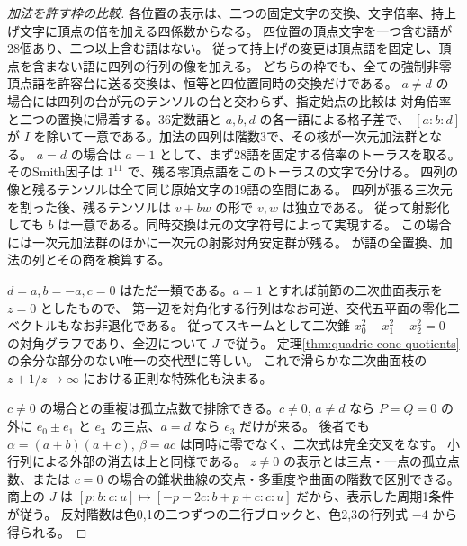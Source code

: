 \begin{proof}[加法を許す枠の比較]
各位置の表示は、二つの固定文字の交換、文字倍率、持上げ文字に頂点の倍を加える四係数からなる。
四位置の頂点文字を一つ含む語が28個あり、二つ以上含む語はない。
従って持上げの変更は頂点語を固定し、頂点を含まない語に四列の行列の像を加える。
どちらの枠でも、全ての強制非零頂点語を許容台に送る交換は、恒等と四位置同時の交換だけである。
$a\ne d$ の場合には四列の台が元のテンソルの台と交わらず、指定始点の比較は
対角倍率と二つの置換に帰着する。36定数語と $a,b,d$ の各一語による格子差で、
$[a:b:d]$ が $I$ を除いて一意である。加法の四列は階数3で、その核が一次元加法群となる。
$a=d$ の場合は $a=1$ として、まず28語を固定する倍率のトーラスを取る。
そのSmith因子は $1^{11}$ で、残る零頂点語をこのトーラスの文字で分ける。
四列の像と残るテンソルは全て同じ原始文字の19語の空間にある。
四列が張る三次元を割った後、残るテンソルは $v+bw$ の形で $v,w$ は独立である。
従って射影化しても $b$ は一意である。同時交換は元の文字符号によって実現する。
この場合には一次元加法群のほかに一次元の射影対角安定群が残る。
 が語の全置換、加法の列とその商を検算する。

$d=a,b=-a,c=0$ はただ一類である。$a=1$ とすれば前節の二次曲面表示を $z=0$ としたもので、
第一辺を対角化する行列はなお可逆、交代五平面の零化二ベクトルもなお非退化である。
従ってスキームとして二次錐 $x_0^2-x_1^2-x_2^2=0$ の対角グラフであり、全辺について $J$ で従う。
定理\ref{thm:quadric-cone-quotients}の余分な部分のない唯一の交代型に等しい。
これで滑らかな二次曲面枝の $z+1/z\to\infty$ における正則な特殊化も決まる。

$c\ne0$ の場合との重複は孤立点数で排除できる。$c\ne0$, $a\ne d$ なら
$P=Q=0$ の外に $e_0\pm e_1$ と $e_3$ の三点、$a=d$ なら $e_3$ だけが来る。
後者でも $\alpha=(a+b)(a+c),\ \beta=ac$ は同時に零でなく、二次式は完全交叉をなす。
小行列による外部の消去は上と同様である。
$z\ne0$ の表示とは三点・一点の孤立点数、または $c=0$ の場合の錐状曲線の交点・多重度や曲面の階数で区別できる。
商上の $J$ は $[p:b:c:u]\mapsto[-p-2c:b+p+c:c:u]$ だから、表示した周期1条件が従う。
反対階数は色0,1の二つずつの二行ブロックと、色2,3の行列式 $-4$ から得られる。
\end{proof}
